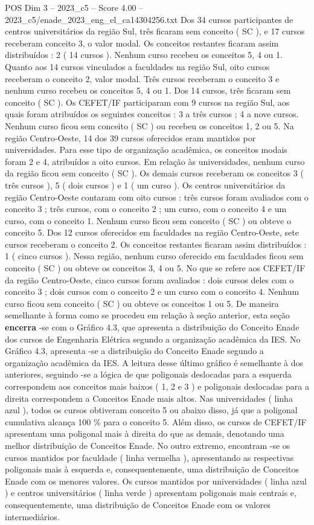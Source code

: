 \begin{textsample}{POS Dim 3 – 2023\_c5 – Score 4.00 – 2023\_c5/enade\_2023\_eng\_el\_ca14304256.txt}
Dos 34 cursos participantes de centros universitários da região Sul, três ficaram sem conceito ( SC ), e 17 cursos receberam conceito 3, o valor modal.
Os conceitos restantes ficaram assim distribuídos : 2 ( 14 cursos ).
Nenhum curso recebeu os conceitos 5, 4 ou 1.
Quanto aos 14 cursos vinculados a faculdades na região Sul, oito cursos receberam o conceito 2, valor modal.
Três cursos receberam o conceito 3 e nenhum curso recebeu os conceitos 5, 4 ou 1.
Dos 14 cursos, três ficaram sem conceito ( SC ).
Os CEFET/IF participaram com 9 cursos na região Sul, aos quais foram atribuídos os seguintes conceitos : 3 a três cursos ; 4 a nove cursos.
Nenhum curso ficou sem conceito ( SC ) ou recebeu os conceitos 1, 2 ou 5.
Na região Centro-Oeste, 14 dos 39 cursos oferecidos eram mantidos por universidades.
Para esse tipo de organização acadêmica, os conceitos modais foram 2 e 4, atribuídos a oito cursos.
Em relação às universidades, nenhum curso da região ficou sem conceito ( SC ).
Os demais cursos receberam os conceitos 3 ( três cursos ), 5 ( dois cursos ) e 1 ( um curso ).
Os centros universitários da região Centro-Oeste contaram com oito cursos : três cursos foram avaliados com o conceito 3 ; três cursos, com o conceito 2 ; um curso, com o conceito 4 e um curso, com o conceito 1.
Nenhum curso ficou sem conceito ( SC ) ou obteve o conceito 5.
Dos 12 cursos oferecidos em faculdades na região Centro-Oeste, sete cursos receberam o conceito 2.
Os conceitos restantes ficaram assim distribuídos : 1 ( cinco cursos ).
Nessa região, nenhum curso oferecido em faculdades ficou sem conceito ( SC ) ou obteve os conceitos 3, 4 ou 5.
No que se refere aos CEFET/IF da região Centro-Oeste, cinco cursos foram avaliados : dois cursos deles com o conceito 3 ; dois cursos com o conceito 2 e um curso com o conceito 4.
Nenhum curso ficou sem conceito ( SC ) ou obteve os conceitos 1 ou 5.
De maneira semelhante à forma como se procedeu em relação à seção anterior, esta seção \textbf{encerra} -se com o Gráfico 4.3, que apresenta a distribuição do Conceito Enade dos cursos de Engenharia Elétrica segundo a organização acadêmica da IES.
No Gráfico 4.3, apresenta -se a distribuição do Conceito Enade segundo a organização acadêmica da IES.
A leitura desse último gráfico é semelhante à dos anteriores, seguindo -se a lógica de que poligonais deslocadas para a esquerda correspondem aos conceitos mais baixos ( 1, 2 e 3 ) e poligonais deslocadas para a direita correspondem a Conceitos Enade mais altos.
Nas universidades ( linha azul ), todos os cursos obtiveram conceito 5 ou abaixo disso, já que a poligonal cumulativa alcança 100 \% para o conceito 5.
Além disso, os cursos de CEFET/IF apresentam uma poligonal mais à direita do que as demais, denotando uma melhor distribuição de Conceitos Enade.
No outro extremo, encontram -se os cursos mantidos por faculdade ( linha vermelha ), apresentando as respectivas poligonais mais à esquerda e, consequentemente, uma distribuição de Conceitos Enade com os menores valores.
Os cursos mantidos por universidades ( linha azul ) e centros universitários ( linha verde ) apresentam poligonais mais centrais e, consequentemente, uma distribuição de Conceitos Enade com os valores intermediários.


\end{textsample}
